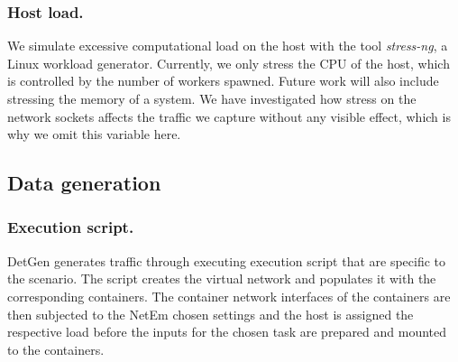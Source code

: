 \documentclass[runningheads]{llncs}
\begin{document}


\subsubsection{Host load.}

We simulate excessive computational load on the host with the tool \emph{stress-ng}, a Linux workload generator. Currently, we only stress the CPU of the host, which is controlled by the number of workers spawned. Future work will also include stressing the memory of a system. We have investigated how stress on the network sockets affects the traffic we capture without any visible effect, which is why we omit this variable here. 

\subsection{Data generation}

\subsubsection*{Execution script.}

DetGen generates traffic through executing execution script that are specific to the scenario. The script creates the virtual network and populates it with the corresponding containers. The container network interfaces of the containers are then subjected to the NetEm chosen settings and the host is assigned the respective load before the inputs for the chosen task are prepared and mounted to the containers. 
\end{document}
